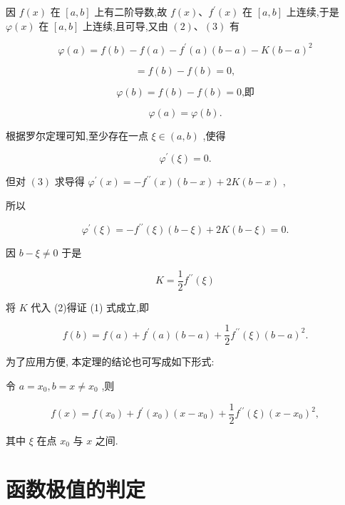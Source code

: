 \documentclass[lang=cn,newtx,12pt,scheme=chinese]{elegantbook}
\begin{document}
因 \(f\left( x\right)\) 在 \(\left\lbrack {a,b}\right\rbrack\) 上有二阶导数,故 \(f\left( x\right) \text{、}{f}^{\prime }\left( x\right)\) 在 \(\left\lbrack {a,b}\right\rbrack\) 上连续,于是 \(\varphi \left( x\right)\) 在 \(\left\lbrack {a,b}\right\rbrack\) 上连续,且可导,又由 \(\left( 2\right) \text{、}\left( 3\right)\) 有

\[
\varphi \left( a\right) = f\left( b\right) - f\left( a\right) - {f}^{\prime }\left( a\right) \left( {b - a}\right) - K{\left( b - a\right) }^{2}
\]

\[
= f\left( b\right) - f\left( b\right) = 0,
\]

\[
\varphi \left( b\right) = f\left( b\right) - f\left( b\right) = 0\text{,即}
\]

\[
\varphi \left( a\right) = \varphi \left( b\right) \text{.}
\]

根据罗尔定理可知,至少存在一点 \(\xi \in \left( {a,b}\right)\) ,使得

\[
{\varphi }^{\prime }\left( \xi \right) = 0.
\]

但对 \(\left( 3\right)\) 求导得 \({\varphi }^{\prime }\left( x\right) = - {f}^{\prime \prime }\left( x\right) \left( {b - x}\right) + {2K}\left( {b - x}\right)\) ,

所以

\[
{\varphi }^{\prime }\left( \xi \right) = - {f}^{\prime \prime }\left( \xi \right) \left( {b - \xi }\right) + {2K}\left( {b - \xi }\right) = 0.
\]

因 \(b - \xi \neq 0\) 于是

\[
K = \frac{1}{2}{f}^{\prime \prime }\left( \xi \right)
\]

将 \(K\) 代入 (2)得证 (1) 式成立,即

\[
f\left( b\right) = f\left( a\right) + {f}^{\prime }\left( a\right) \left( {b - a}\right) + \frac{1}{2}{f}^{\prime \prime }\left( \xi \right) {\left( b - a\right) }^{2}.
\]

为了应用方便, 本定理的结论也可写成如下形式:

令 \(a = {x}_{0},b = x \neq {x}_{0}\) ,则

\[
f\left( x\right) = f\left( {x}_{0}\right) + {f}^{\prime }\left( {x}_{0}\right) \left( {x - {x}_{0}}\right) + \frac{1}{2}{f}^{\prime \prime }\left( \xi \right) {\left( x - {x}_{0}\right) }^{2}, \tag{4}
\]

其中 \(\xi\) 在点 \({x}_{0}\) 与 \(x\) 之间.

\section{函数极值的判定}
\end{document}
